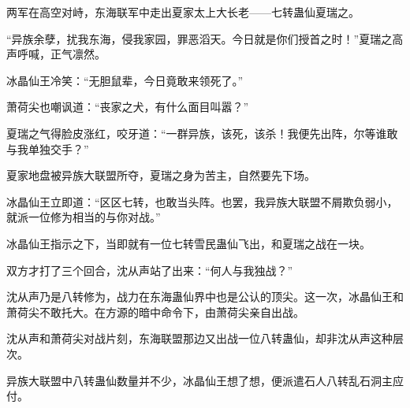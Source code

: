 \begin{this_body}
两军在高空对峙，东海联军中走出夏家太上大长老——七转蛊仙夏瑞之。

“异族余孽，扰我东海，侵我家园，罪恶滔天。今日就是你们授首之时！”夏瑞之高声呼喊，正气凛然。

冰晶仙王冷笑：“无胆鼠辈，今日竟敢来领死了。”

萧荷尖也嘲讽道：“丧家之犬，有什么面目叫嚣？”

夏瑞之气得脸皮涨红，咬牙道：“一群异族，该死，该杀！我便先出阵，尔等谁敢与我单独交手？”

夏家地盘被异族大联盟所夺，夏瑞之身为苦主，自然要先下场。

冰晶仙王立即道：“区区七转，也敢当头阵。也罢，我异族大联盟不屑欺负弱小，就派一位修为相当的与你对战。”

冰晶仙王指示之下，当即就有一位七转雪民蛊仙飞出，和夏瑞之战在一块。

双方才打了三个回合，沈从声站了出来：“何人与我独战？”

沈从声乃是八转修为，战力在东海蛊仙界中也是公认的顶尖。这一次，冰晶仙王和萧荷尖不敢托大。在方源的暗中命令下，由萧荷尖亲自出战。

沈从声和萧荷尖对战片刻，东海联盟那边又出战一位八转蛊仙，却非沈从声这种层次。

异族大联盟中八转蛊仙数量并不少，冰晶仙王想了想，便派遣石人八转乱石洞主应付。

\end{this_body}


